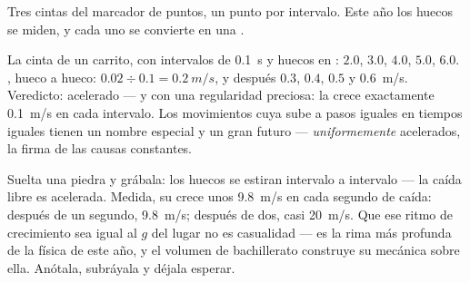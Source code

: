 \begin{omfigure}

{\small Tres cintas del marcador de puntos, un punto por intervalo.
Este año los huecos se miden, y cada uno se convierte en una
.}
\end{omfigure}

\begin{example}\label{ex:g9:uniform-varied-motion:worked}
La cinta de un carrito, con intervalos de \qty{0.1}{s} y huecos en
: $2.0$, $3.0$, $4.0$, $5.0$, $6.0$.
, hueco a hueco: $0.02 \div 0.1 = \qty{0.2}{m/s}$, y
después $0.3$, $0.4$, $0.5$ y \qty{0.6}{m/s}. Veredicto: acelerado ---
y con una regularidad preciosa: la  crece exactamente
\qty{0.1}{m/s} en cada intervalo. Los movimientos cuya
 sube a pasos iguales en tiempos iguales tienen un
nombre especial y un gran futuro --- \emph{uniformemente} acelerados,
la firma de las causas constantes.
\end{example}

\begin{example}\label{ex:g9:uniform-varied-motion:freefall}
Suelta una piedra y grábala: los huecos se estiran intervalo a
intervalo --- la caída libre es acelerada. Medida, su
 crece unos \qty{9.8}{m/s} en cada segundo de caída:
después de un segundo, \qty{9.8}{m/s}; después de dos, casi
\qty{20}{m/s}. Que ese ritmo de crecimiento sea igual al $g$ del lugar
no es casualidad --- es la rima más profunda de la física de este año,
y el volumen de bachillerato construye su mecánica sobre ella. Anótala,
subráyala y déjala esperar.
\end{example}

